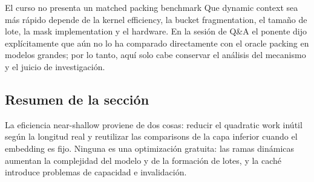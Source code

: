 
\begin{warningbox}{El curso no presenta un matched packing benchmark}
Que dynamic context sea más rápido depende de la kernel efficiency, la bucket fragmentation, el tamaño de lote, la mask implementation y el hardware. En la sesión de Q\&A el ponente dijo explícitamente que aún no lo ha comparado directamente con el oracle packing en modelos grandes; por lo tanto, aquí solo cabe conservar el análisis del mecanismo y el juicio de investigación.
\end{warningbox}



\subsection{Resumen de la sección}

La eficiencia near-shallow proviene de dos cosas: reducir el quadratic work inútil según la longitud real y reutilizar las comparisons de la capa inferior cuando el embedding es fijo. Ninguna es una optimización gratuita: las ramas dinámicas aumentan la complejidad del modelo y de la formación de lotes, y la caché introduce problemas de capacidad e invalidación.
